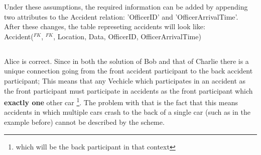 Under these assumptions, the required information can be added
by appending two attributes to the Accident relation: 'OfficerID' and 'OfficerArrivalTime'.\\
After these changes, the table represeting accidents will look like:\\
Accident($^{FK}$, $^{FK}$, Location, Data, OfficerID, OfficerArrivalTime)

\subsection{}
Alice is correct.
Since in both the solution of Bob and that of Charlie
there is a unique connection going from the front accident
participant to the back accident participant;
This means that any Vechicle which participates
in an accident as the front participant
must participate in accidents as the front participant
which \textbf{exactly one} other car
\footnote{which will be the back participant in that context}.
The problem with that is the fact that this means
accidents in which multiple cars crash to the back of a single
car (such as in the example before) cannot be described by the scheme.